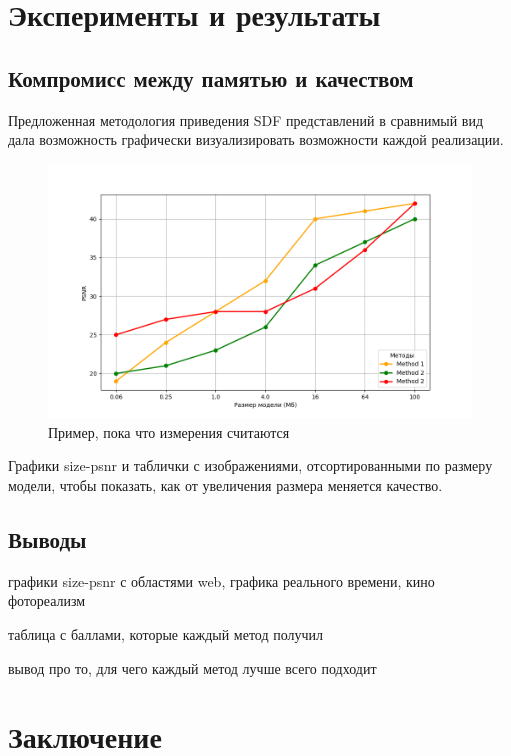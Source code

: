 \documentclass[a4paper,hidelinks,12pt]{article}
\begin{document}
\newpage

\section{Эксперименты и результаты}

\subsection{Компромисс между памятью и качеством}

Предложенная методология приведения SDF представлений в сравнимый вид дала возможность графически визуализировать возможности каждой реализации.

\begin{figure}[ht]
  \centering
  \includegraphics[width=1\textwidth]{example.png}
  \caption{Пример, пока что измерения считаются}
  \label{fig:example}
\end{figure}

Графики size-psnr и таблички с изображениями, отсортированными по размеру модели, чтобы показать, как от увеличения размера меняется качество.

\subsection{Выводы}

графики size-psnr с областями web, графика реального времени, кино фотореализм

таблица с баллами, которые каждый метод получил

вывод про то, для чего каждый метод лучше всего подходит

\newpage

\section{Заключение}
\end{document}

